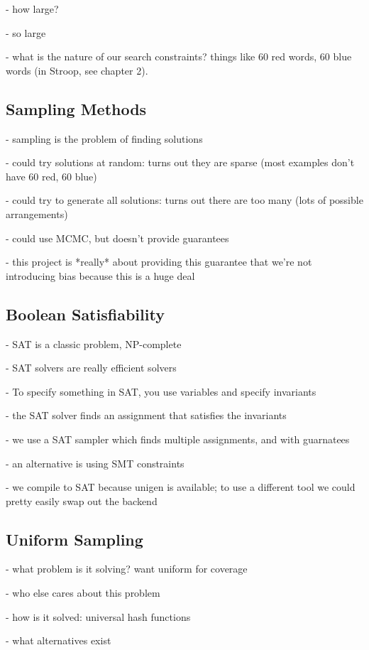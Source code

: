 - how large?

- so large

- what is the nature of our search constraints? things like 60 red words, 60 blue words (in Stroop, see chapter 2).


\subsection{Sampling Methods}

- sampling is the problem of finding solutions

- could try solutions at random: turns out they are sparse (most examples don't have 60 red, 60 blue)

- could try to generate all solutions: turns out there are too many (lots of possible arrangements)

- could use MCMC, but doesn't provide guarantees

- this project is *really* about providing this guarantee that we're not introducing bias because this is a huge deal

\subsection{Boolean Satisfiability}

- SAT is a classic problem, NP-complete

- SAT solvers are really efficient solvers

- To specify something in SAT, you use variables and specify invariants

- the SAT solver finds an assignment that satisfies the invariants

- we use a SAT sampler which finds multiple assignments, and with guarnatees

- an alternative is using SMT constraints

- we compile to SAT because unigen is available; to use a different tool we could pretty easily swap out the backend

\cite{tseitin1983complexity}

\subsection{Uniform Sampling}

\cite{meel2016constrained}

- what problem is it solving? want uniform for coverage

- who else cares about this problem

- how is it solved: universal hash functions

- what alternatives exist
